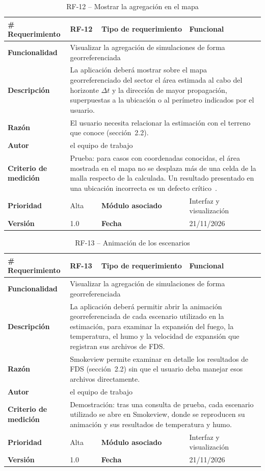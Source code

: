\begin{longtable}{|p{\rqA}|p{\rqB}|p{\rqC}|p{\rqD}|}
  \caption{RF-12 -- Mostrar la agregación en el mapa}\label{tab:rf-12}\tabularnewline
  \hline
  \textbf{\# Requerimiento} & RF-12 & \raggedright\textbf{Tipo de requerimiento} & Funcional\tabularnewline\hline
  \raggedright\textbf{Funcionalidad} & \multicolumn{3}{p{\rqBCD}|}{Visualizar la agregación de simulaciones de forma georreferenciada}\tabularnewline\hline
  \endfirsthead
  \textbf{Descripción} & \multicolumn{3}{p{\rqBCD}|}{La aplicación deberá mostrar sobre el mapa georreferenciado del sector el área estimada al cabo del horizonte $\Delta t$ y la dirección de mayor propagación, superpuestas a la ubicación o al perímetro indicados por el usuario.}\tabularnewline\hline
  \textbf{Razón} & \multicolumn{3}{p{\rqBCD}|}{El usuario necesita relacionar la estimación con el terreno que conoce (sección~2.2).}\tabularnewline\hline
  \textbf{Autor} & \multicolumn{3}{p{\rqBCD}|}{el equipo de trabajo}\tabularnewline\hline
  \raggedright\textbf{Criterio de medición} & \multicolumn{3}{p{\rqBCD}|}{Prueba: para casos con coordenadas conocidas, el área mostrada en el mapa no se desplaza más de una celda de la malla respecto de la calculada. Un resultado presentado en una ubicación incorrecta es un defecto crítico~\cite{pmp2026}.}\tabularnewline\hline
  \textbf{Prioridad} & Alta & \raggedright\textbf{Módulo asociado} & Interfaz y visualización\tabularnewline\hline
  \textbf{Versión} & 1.0 & \textbf{Fecha} & 21/11/2026\tabularnewline\hline
\end{longtable}

\begin{longtable}{|p{\rqA}|p{\rqB}|p{\rqC}|p{\rqD}|}
  \caption{RF-13 -- Animación de los escenarios}\label{tab:rf-13}\tabularnewline
  \hline
  \textbf{\# Requerimiento} & RF-13 & \raggedright\textbf{Tipo de requerimiento} & Funcional\tabularnewline\hline
  \raggedright\textbf{Funcionalidad} & \multicolumn{3}{p{\rqBCD}|}{Visualizar la agregación de simulaciones de forma georreferenciada}\tabularnewline\hline
  \endfirsthead
  \textbf{Descripción} & \multicolumn{3}{p{\rqBCD}|}{La aplicación deberá permitir abrir la animación georreferenciada de cada escenario utilizado en la estimación, para examinar la expansión del fuego, la temperatura, el humo y la velocidad de expansión que registran sus archivos de FDS.}\tabularnewline\hline
  \textbf{Razón} & \multicolumn{3}{p{\rqBCD}|}{Smokeview permite examinar en detalle los resultados de FDS (sección~2.2) sin que el usuario deba manejar esos archivos directamente.}\tabularnewline\hline
  \textbf{Autor} & \multicolumn{3}{p{\rqBCD}|}{el equipo de trabajo}\tabularnewline\hline
  \raggedright\textbf{Criterio de medición} & \multicolumn{3}{p{\rqBCD}|}{Demostración: tras una consulta de prueba, cada escenario utilizado se abre en Smokeview, donde se reproducen su animación y sus resultados de temperatura y humo.}\tabularnewline\hline
  \textbf{Prioridad} & Alta & \raggedright\textbf{Módulo asociado} & Interfaz y visualización\tabularnewline\hline
  \textbf{Versión} & 1.0 & \textbf{Fecha} & 21/11/2026\tabularnewline\hline
\end{longtable}

